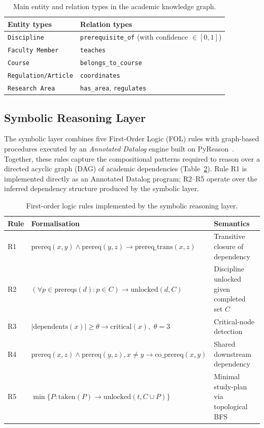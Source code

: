 \documentclass[runningheads]{llncs}
\begin{document}
\begin{table}[t]
\caption{Main entity and relation types in the academic knowledge graph.}
\label{tab:kg}
\centering
\begin{tabular}{ll}
\hline
\textbf{Entity types} & \textbf{Relation types} \\
\hline
\texttt{Discipline} & \texttt{prerequisite\_of} (with confidence $\in [0,1]$) \\
\texttt{Faculty Member} & \texttt{teaches} \\
\texttt{Course} & \texttt{belongs\_to\_course} \\
\texttt{Regulation/Article} & \texttt{coordinates} \\
\texttt{Research Area} & \texttt{has\_area}, \texttt{regulates} \\
\hline
\end{tabular}
\end{table}


\subsection{Symbolic Reasoning Layer}
\label{sec:symbolic}

The symbolic layer combines five First-Order Logic (FOL) rules with graph-based procedures executed by an \emph{Annotated Datalog} engine built on PyReason~\cite{aditya2023}. Together, these rules capture the compositional patterns required to reason over a directed acyclic graph (DAG) of academic dependencies (Table~\ref{tab:rules}). Rule R1 is implemented directly as an Annotated Datalog program; R2--R5 operate over the inferred dependency structure produced by the symbolic layer.

\begin{table}[t]
\caption{First-order logic rules implemented by the symbolic reasoning layer.}
\label{tab:rules}
\centering
\small
\begin{tabular}{lll}
\hline
\textbf{Rule} & \textbf{Formalisation} & \textbf{Semantics} \\
\hline
R1 & $\mathrm{prereq}(x,y) \wedge \mathrm{prereq}(y,z) \rightarrow \mathrm{prereq\_trans}(x,z)$ & Transitive closure of dependency \\
R2 & $(\forall p \in \mathrm{prereqs}(d): p \in C) \rightarrow \mathrm{unlocked}(d, C)$ & Discipline unlocked given completed set $C$ \\
R3 & $|\mathrm{dependents}(x)| \geq \theta \rightarrow \mathrm{critical}(x)$,\ $\theta=3$ & Critical-node detection \\
R4 & $\mathrm{prereq}(x,z) \wedge \mathrm{prereq}(y,z), x\neq y \rightarrow \mathrm{co\_prereq}(x,y)$ & Shared downstream dependency \\
R5 & $\min\{P: \mathrm{taken}(P) \rightarrow \mathrm{unlocked}(t, C\cup P)\}$ & Minimal study-plan via topological BFS \\
\hline
\end{tabular}
\end{table}
\end{document}
